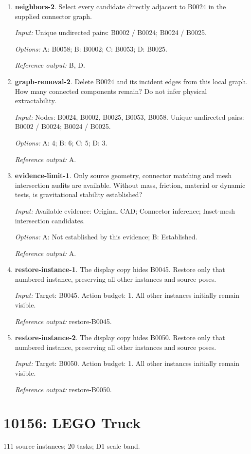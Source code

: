 \begin{enumerate}
\item \textbf{neighbors-2}. Select every candidate directly adjacent to B0024 in the supplied connector graph.\par {\small \textit{Input:} Unique undirected pairs: B0002 / B0024; B0024 / B0025. \par\textit{Options:} A: B0058; B: B0002; C: B0053; D: B0025. \par\textit{Reference output:} B, D.}
\item \textbf{graph-removal-2}. Delete B0024 and its incident edges from this local graph. How many connected components remain? Do not infer physical extractability.\par {\small \textit{Input:} Nodes: B0024, B0002, B0025, B0053, B0058. Unique undirected pairs: B0002 / B0024; B0024 / B0025. \par\textit{Options:} A: 4; B: 6; C: 5; D: 3. \par\textit{Reference output:} A.}
\item \textbf{evidence-limit-1}. Only source geometry, connector matching and mesh intersection audits are available. Without mass, friction, material or dynamic tests, is gravitational stability established?\par {\small \textit{Input:} Available evidence: Original CAD; Connector inference; Inset-mesh intersection candidates. \par\textit{Options:} A: Not established by this evidence; B: Established. \par\textit{Reference output:} A.}
\item \textbf{restore-instance-1}. The display copy hides B0045. Restore only that numbered instance, preserving all other instances and source poses.\par {\small \textit{Input:} Target: B0045. Action budget: 1. All other instances initially remain visible. \par\textit{Reference output:} restore-B0045.}
\item \textbf{restore-instance-2}. The display copy hides B0050. Restore only that numbered instance, preserving all other instances and source poses.\par {\small \textit{Input:} Target: B0050. Action budget: 1. All other instances initially remain visible. \par\textit{Reference output:} restore-B0050.}
\end{enumerate}
\clearpage
\section{10156: LEGO Truck}
111 source instances; 20 tasks; D1 scale band.

